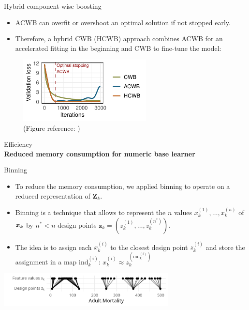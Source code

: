 \documentclass[t,10pt]{beamer}
\newcommand{\fSlide}[2]{
\begin{frame}[plain]{}%
  \vspace{4cm}%
  \Large #1\\[0.2cm]%
  {\LARGE\textbf{#2}}%
	\addtocounter{framenumber}{-1}%
\end{frame}%
}
\begin{document}
\begin{frame}{Hybrid component-wise boosting}
  \begin{itemize}
    \item
      ACWB can overfit or overshoot an optimal solution if not stopped early.
    \item
      Therefore, a hybrid CWB (HCWB) approach combines ACWB for an accelerated fitting in the beginning and CWB
      to fine-tune the model:
  \end{itemize}

  \begin{figure}
    \centering
    \includegraphics[width=0.6\textwidth]{figures/fig-HCWB.pdf}
    \caption{\small(Figure reference: \citet{schalk2022accelerated})}
  \end{figure}
\end{frame}

\fSlide{Efficiency}{Reduced memory consumption for numeric base learner}

\begin{frame}{Binning}
  \begin{itemize}
    \item
      To reduce the memory consumption, we applied binning to operate on a
      reduced representation of \(\bm{Z}_k\).
    \item
      Binning is a technique that allows to represent the \(n\) values
      \(x_k^{(1)}, \dots, x_k^{(n)}\) of \(\bm{x}_k\) by \(n^\ast < n\) design
      points \(\bm{z}_k = (z_k^{(1)}, \dots, z_k^{(n^\ast)})\).
    \item
      The idea is to assign each \(x_k^{(i)}\) to the closest design point
      \(z_k^{(i)}\) and store the assignment in a map
      \(\text{ind}_k^{(i)}\):
      \(x_k^{(i)} \approx z_k^{(\text{ind}_k^{(i)})}\)
  \end{itemize}

  \begin{center}\includegraphics[width=9cm]{figures/binning/fig-xbin.png} \end{center}
\end{frame}
\end{document}
